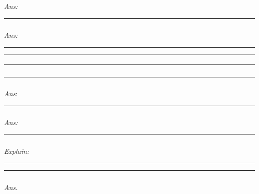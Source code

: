 \documentclass[
]{article}
\begin{document}
\emph{Ans:}

\begin{center}\rule{0.5\linewidth}{0.5pt}\end{center}

\hypertarget{section-3}{%
\subparagraph{}\label{section-3}}

\emph{Ans:}

\begin{center}\rule{0.5\linewidth}{0.5pt}\end{center}

\begin{center}\rule{0.5\linewidth}{0.5pt}\end{center}

\hypertarget{section-4}{%
\paragraph{}\label{section-4}}

\begin{center}\rule{0.5\linewidth}{0.5pt}\end{center}

\hypertarget{section-5}{%
\subparagraph{}\label{section-5}}

\begin{center}\rule{0.5\linewidth}{0.5pt}\end{center}

\hypertarget{section-6}{%
\subparagraph{}\label{section-6}}

\emph{Ans}:

\begin{center}\rule{0.5\linewidth}{0.5pt}\end{center}

\hypertarget{section-7}{%
\subparagraph{}\label{section-7}}

\emph{Ans: }

\begin{center}\rule{0.5\linewidth}{0.5pt}\end{center}

\hypertarget{section-8}{%
\subparagraph{}\label{section-8}}

\emph{Explain:}

\begin{center}\rule{0.5\linewidth}{0.5pt}\end{center}

\begin{center}\rule{0.5\linewidth}{0.5pt}\end{center}

\hypertarget{section-9}{%
\subparagraph{}\label{section-9}}

\emph{Ans. }
\end{document}
